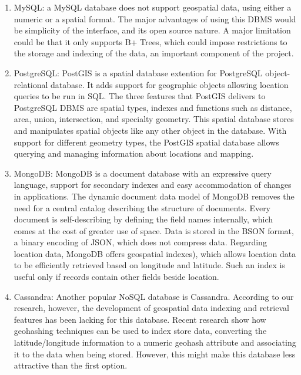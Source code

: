 \documentclass[conference]{IEEEtran}
\begin{document}
\begin{enumerate}

\item MySQL: a MySQL database does not support geospatial data, using either a numeric or a spatial format. The major advantages of using this DBMS would be simplicity of the interface, and its open source nature. A major limitation could be that it only supports B+ Trees, which could impose restrictions to the storage and indexing of the data, an important component of the project. 

\item PostgreSQL: PostGIS is a spatial database extention for PostgreSQL object-relational database. It adds support for geographic objects allowing location queries to be run in SQL. The three features that PostGIS delivers to PostgreSQL DBMS are spatial types, indexes and functions such as distance, area, union, intersection, and specialty geometry. This spatial database stores and manipulates spatial objects like any other object in the database. With support for different geometry types, the PostGIS spatial database allows querying and managing information about locations and mapping.

\item MongoDB: MongoDB is a document database with an expressive query language, support for secondary indexes and easy accommodation of changes in applications. The dynamic document data model of MongoDB removes the need for a central catalog describing the structure of documents. Every document is self-describing by defining the field names internally, which comes at the cost of greater use of space. Data is stored in the BSON format, a binary encoding of JSON, which does not compress data. 
Regarding location data, MongoDB offers geospatial indexes), which allows location data to be efficiently retrieved based on longitude and latitude. Such an index is useful only if records contain other fields beside location.
 
\item Cassandra: Another popular NoSQL database is Cassandra. According to our research, however, the development of geospatial data indexing and retrieval features has been lacking for this database.  Recent research show how geohashing techniques can be used to index store data, converting the latitude/longitude information to a numeric geohash attribute and associating it to the data when being stored. However, this might make this database less attractive than the first option. 

\end{enumerate}
\end{document}
